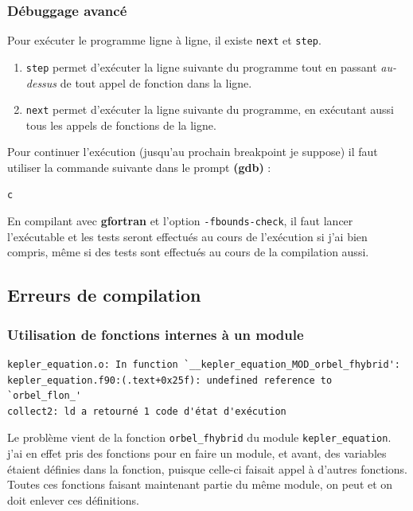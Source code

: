 \documentclass[a4paper,twoside]{article}
\begin{document}
\subsubsection{Débuggage avancé}
Pour exécuter le programme ligne à ligne, il existe \texttt{next} et \texttt{step}. 
\begin{enumerate}
\item \texttt{step} permet d'exécuter la ligne suivante du programme tout en passant \emph{au-dessus} de tout appel de fonction dans la ligne.
\item \texttt{next} permet d'exécuter la ligne suivante du programme, en exécutant aussi tous les appels de fonctions de la ligne.
\end{enumerate}


\bigskip

Pour continuer l'exécution (jusqu'au prochain breakpoint je suppose) il faut utiliser la commande suivante dans le prompt \textbf{(gdb)} :
\begin{verbatim}
c
\end{verbatim}

\begin{remarque}
En compilant avec \textbf{gfortran} et l'option \texttt{-fbounds-check}, il faut lancer l'exécutable et les tests seront effectués au cours de l'exécution si j'ai bien compris, même si des tests sont effectués au cours de la compilation aussi.
\end{remarque}


\subsection{Erreurs de compilation}
\subsubsection{Utilisation de fonctions internes à un module}
\begin{verbatim}
kepler_equation.o: In function `__kepler_equation_MOD_orbel_fhybrid':
kepler_equation.f90:(.text+0x25f): undefined reference to `orbel_flon_'
collect2: ld a retourné 1 code d'état d'exécution
\end{verbatim}

Le problème vient de la fonction \verb|orbel_fhybrid| du module \verb|kepler_equation|. j'ai en effet pris des fonctions pour en faire un module, et avant, des variables étaient définies dans la fonction, puisque celle-ci faisait appel à d'autres fonctions. Toutes ces fonctions faisant maintenant partie du même module, on peut et on doit enlever ces définitions. 
\end{document}
